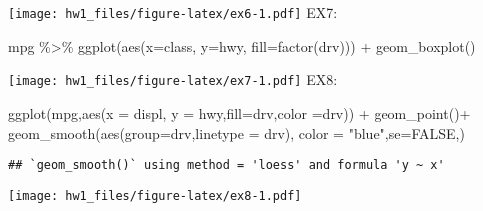 \documentclass[
]{article}
\newenvironment{Shaded}{\begin{snugshade}}{\end{snugshade}}
\newcommand{\AttributeTok}[1]{\textcolor[rgb]{0.77,0.63,0.00}{#1}}
\newcommand{\ConstantTok}[1]{\textcolor[rgb]{0.00,0.00,0.00}{#1}}
\newcommand{\FunctionTok}[1]{\textcolor[rgb]{0.00,0.00,0.00}{#1}}
\newcommand{\NormalTok}[1]{#1}
\newcommand{\SpecialCharTok}[1]{\textcolor[rgb]{0.00,0.00,0.00}{#1}}
\newcommand{\StringTok}[1]{\textcolor[rgb]{0.31,0.60,0.02}{#1}}
\begin{document}
\texttt{[image: hw1\_files/figure-latex/ex6-1.pdf]} EX7:

\begin{Shaded}
\begin{Highlighting}[]
\NormalTok{mpg }\SpecialCharTok{\%\textgreater{}\%} 
  \FunctionTok{ggplot}\NormalTok{(}\FunctionTok{aes}\NormalTok{(}\AttributeTok{x=}\NormalTok{class, }\AttributeTok{y=}\NormalTok{hwy, }\AttributeTok{fill=}\FunctionTok{factor}\NormalTok{(drv))) }\SpecialCharTok{+}
  \FunctionTok{geom\_boxplot}\NormalTok{() }
\end{Highlighting}
\end{Shaded}

\texttt{[image: hw1\_files/figure-latex/ex7-1.pdf]} EX8:

\begin{Shaded}
\begin{Highlighting}[]
\FunctionTok{ggplot}\NormalTok{(mpg,}\FunctionTok{aes}\NormalTok{(}\AttributeTok{x =}\NormalTok{ displ, }\AttributeTok{y =}\NormalTok{ hwy,}\AttributeTok{fill=}\NormalTok{drv,}\AttributeTok{color =}\NormalTok{drv)) }\SpecialCharTok{+}
  \FunctionTok{geom\_point}\NormalTok{()}\SpecialCharTok{+}
  \FunctionTok{geom\_smooth}\NormalTok{(}\FunctionTok{aes}\NormalTok{(}\AttributeTok{group=}\NormalTok{drv,}\AttributeTok{linetype =}\NormalTok{ drv), }\AttributeTok{color =} \StringTok{"blue"}\NormalTok{,}\AttributeTok{se=}\ConstantTok{FALSE}\NormalTok{,)}
\end{Highlighting}
\end{Shaded}

\begin{verbatim}
## `geom_smooth()` using method = 'loess' and formula 'y ~ x'
\end{verbatim}

\texttt{[image: hw1\_files/figure-latex/ex8-1.pdf]}
\end{document}
